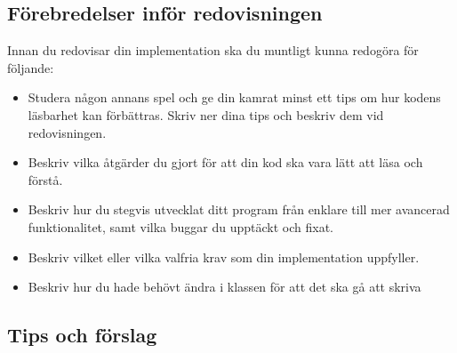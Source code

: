 \subsection{Förebredelser inför redovisningen}
\Checkpoint\noindent Innan du redovisar din implementation ska du muntligt kunna redogöra för följande:
\begin{itemize}[nosep, label={$\square$}]
  \item Studera någon annans spel och ge din kamrat minst ett tips om hur kodens läsbarhet kan förbättras. Skriv ner dina tips och beskriv dem vid redovisningen.
  \item Beskriv vilka åtgärder du gjort för att din kod ska vara lätt att läsa och förstå.
  \item Beskriv hur du stegvis utvecklat ditt program från enklare till mer avancerad funktionalitet, samt vilka buggar du upptäckt och fixat.
  \item Beskriv vilket eller vilka valfria krav som din implementation uppfyller.
  \item Beskriv hur du hade behövt ändra i klassen  för att det ska gå att skriva\\
\end{itemize}

\subsection{Tips och förslag}

